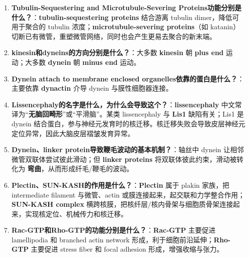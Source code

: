 \documentclass[12pt,fontset=none]{ctexart}
\begin{document}
\begin{enumerate}
\item \textbf{Tubulin-Sequestering and Microtubule-Severing Proteins功能分别是什么？}：\textbf{tubulin-sequestering proteins} 结合游离 tubulin dimer，降低可用于聚合的 tubulin 浓度；\textbf{microtubule-severing proteins}（如 katanin）切断已有微管，重塑微管网络，同时也会产生更易去聚合的新末端。

\item \textbf{kinesin和dyneins的方向分别是什么？}：大多数 \textbf{kinesin} 朝 \textbf{plus end} 运动；大多数 \textbf{dynein} 朝 \textbf{minus end} 运动。

\item \textbf{Dynein attach to membrane enclosed organelles依靠的蛋白是什么？}：主要依靠 \textbf{dynactin} 介导 dynein 与膜性细胞器连接。

\item \textbf{Lissencephaly的名字是什么，为什么会导致这个？}：\textbf{lissencephaly} 中文常译为“\textbf{无脑回畸形}”或“平滑脑”。某类 lissencephaly 与 \textbf{Lis1} 缺陷有关；Lis1 是 dynein 结合蛋白，参与神经元发育时的核迁移。核迁移失败会导致皮层神经元定位异常，因此大脑皮层褶皱发育异常。

\item \textbf{Dynein、linker protein导致鞭毛波动的基本机制？}：轴丝中 dynein 让相邻微管双联体尝试彼此滑动；但 \textbf{linker proteins} 将双联体彼此约束，滑动被转化为 \textbf{弯曲}，从而形成纤毛/鞭毛的波动。

\item \textbf{Plectin、SUN-KASH的作用是什么？}：\textbf{Plectin} 属于 plakin 家族，把 intermediate filament 与微管、actin 或膜连接起来，起交联和力学整合作用；\textbf{SUN-KASH complex} 横跨核膜，把核纤层/核内骨架与细胞质骨架连接起来，实现核定位、机械传力和核迁移。

\item \textbf{Rac-GTP和Rho-GTP的功能分别是什么？}：\textbf{Rac-GTP} 主要促进 lamellipodia 和 branched actin network 形成，利于细胞前沿延伸；\textbf{Rho-GTP} 主要促进 stress fiber 和 focal adhesion 形成，增强收缩与张力。

\end{enumerate}
\end{document}
